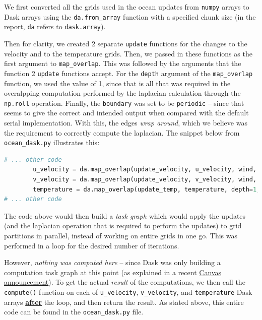 \documentclass[a4paper,12pt]{article}
\begin{document}
We first converted all the grids used in the ocean updates from \verb|numpy| arrays to Dask arrays using the \verb|da.from_array| function with a specified chunk size (in the report, \verb|da| refers to \verb|dask.array|). 

Then for clarity, we created 2 separate \verb|update| functions for the changes to the velocity and to the temperature grids. Then, we passed in these functions as the first argument to \verb|map_overlap|. This was followed by the arguments that the function 2 \verb|update| functions accept. For the \verb|depth| argument of the \verb|map_overlap| function, we used the value of 1, since that is all that was required in the overalpping computation performed by the laplacian calculation through the \verb|np.roll| operation. Finally, the \verb|boundary| was set to be \verb|periodic| -- since that seems to give the correct and intended output when compared with the default serial implementation. With this, the edges \textit{wrap around}, which we believe was the requirement to correctly compute the laplacian. The snippet below from \verb|ocean_dask.py| illustrates this:

\begin{lstlisting}[language=python,basicstyle=\tiny\ttfamily]
# ... other code
        u_velocity = da.map_overlap(update_velocity, u_velocity, wind, depth=1, boundary="periodic", dtype=da.float64)
        v_velocity = da.map_overlap(update_velocity, v_velocity, wind, depth=1, boundary="periodic", dtype=da.float64)
        temperature = da.map_overlap(update_temp, temperature, depth=1, boundary="periodic", dtype=da.float64)
# ... other code

\end{lstlisting}
The code above would then build a \textit{task graph} which would apply the updates (and the laplacian operation that is required to perform the updates) to grid partitions in parallel, instead of working on entire grids in one go. This was performed in a loop for the desired number of iterations. 

However, \textit{nothing was computed here} -- since Dask was only building a computation task graph at this point (as explained in a recent \href{https://canvas.kth.se/courses/52247/discussion_topics/452810}{Canvas announcement}). To get the actual \textit{result} of the computations, we then call the \verb|compute()| function on each of \verb|u_velocity|, \verb|v_velocity|, and \verb|temperature| Dask arrays \textbf{\underline{after}} the loop, and then return the result. As stated above, this entire code can be found in the \verb|ocean_dask.py| file.
\end{document}
